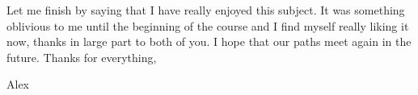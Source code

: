 Let me finish by saying that I have really enjoyed this subject. It was something oblivious to me until the beginning of the course and I find myself really liking it now, thanks in large part to both of you. I hope that our paths meet again in the future. Thanks for everything,\bigskip

Alex

\bigskip




\clearpage
